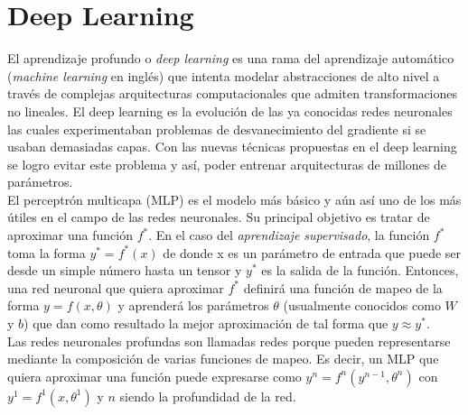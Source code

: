         
        
            


\newpage
\section{Deep Learning}
	
El aprendizaje profundo o \textit{deep learning} es una rama del aprendizaje automático (\textit{machine learning} en inglés) que intenta modelar abstracciones de alto nivel a través de complejas arquitecturas computacionales que admiten transformaciones no lineales. El deep learning es la evolución de las ya conocidas redes neuronales las cuales experimentaban problemas de desvanecimiento del gradiente si se usaban demasiadas capas. Con las nuevas técnicas propuestas en el deep learning se logro evitar este problema y así, poder entrenar arquitecturas de millones de parámetros. \\

El perceptrón multicapa (MLP) es el modelo más básico y aún así uno de los más útiles en el campo de las redes neuronales. Su principal objetivo es tratar de aproximar una función $f^{*}$. En el caso del \textit{aprendizaje supervisado}, la función $f^{*}$ toma la forma $y^{*} = f^{*}(x)$ de donde x es un parámetro de entrada que puede ser desde un simple número hasta un tensor y $y^{*}$ es la salida de la función. Entonces, una red neuronal que quiera aproximar $f^{*}$ definirá una función de mapeo de la forma $y = f(x,\theta)$ y aprenderá los parámetros $\theta$ (usualmente conocidos como $W$ y $b$) que dan como resultado la mejor aproximación de tal forma que $y \approx y^{*}$. \\

Las redes neuronales profundas son llamadas redes porque pueden representarse mediante la composición de varias funciones de mapeo. Es decir, un MLP que quiera aproximar una función puede expresarse como $y^{n} = f^{n}(y^{n-1}, \theta^{n})$ con $y^{1} = f^{1}(x, \theta^{1})$ y $n$ siendo la profundidad de la red. 

